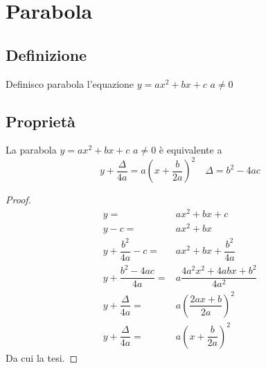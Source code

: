 \chapter{Parabola}
\section{Definizione}
\begin{defn}
Definisco parabola l'equazione $y=ax^2+bx+c$ $a\neq0$
\end{defn}
\section{Proprietà}
\begin{thm}\label{thm:Parabola_complemento}
	La parabola $y=ax^2+bx+c$ $a\neq0$ è equivalente a \begin{equation*}
	y+\dfrac{\Delta}{4a}=a\left(x+\dfrac{b}{2a}\right)^2\quad\Delta=b^2-4ac
	\end{equation*}\label{equa:Parabola_scomposizione}
\end{thm}
\begin{proof}
	\begin{align*}
	y=&ax^2+bx+c\\
	y-c=&ax^2+bx\\
	y+\dfrac{b^2}{4a}-c=&ax^2+bx+\dfrac{b^2}{4a}\\
	y+\dfrac{b^2-4ac}{4a}=&a\dfrac{4a^2x^2+4abx+b^2}{4a^2}\\
	y+\dfrac{\Delta}{4a}=&a\left(\dfrac{2ax+b}{2a}\right)^2\\
	y+\dfrac{\Delta}{4a}=&a\left(x+\dfrac{b}{2a}\right)^2
	\end{align*}
	Da cui la tesi.
\end{proof}
